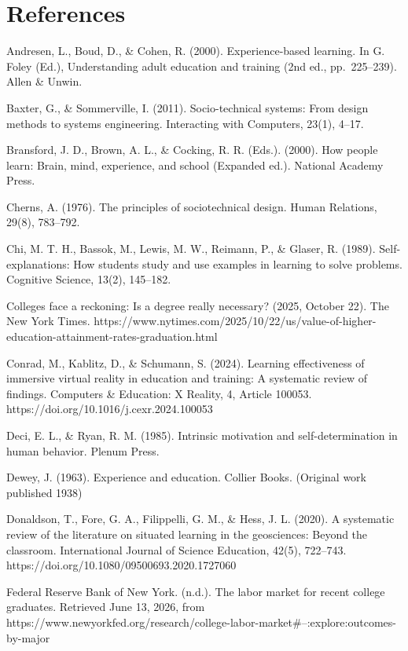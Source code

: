 \documentclass[
  12pt]{article}
\begin{document}
\section{References}\label{references}

Andresen, L., Boud, D., \& Cohen, R. (2000). Experience-based learning.
In G. Foley (Ed.), Understanding adult education and training (2nd ed.,
pp.~225--239). Allen \& Unwin.

Baxter, G., \& Sommerville, I. (2011). Socio-technical systems: From
design methods to systems engineering. Interacting with Computers,
23(1), 4--17.

Bransford, J. D., Brown, A. L., \& Cocking, R. R. (Eds.). (2000). How
people learn: Brain, mind, experience, and school (Expanded ed.).
National Academy Press.

Cherns, A. (1976). The principles of sociotechnical design. Human
Relations, 29(8), 783--792.

Chi, M. T. H., Bassok, M., Lewis, M. W., Reimann, P., \& Glaser, R.
(1989). Self-explanations: How students study and use examples in
learning to solve problems. Cognitive Science, 13(2), 145--182.

Colleges face a reckoning: Is a degree really necessary? (2025, October
22). The New York Times.
https://www.nytimes.com/2025/10/22/us/value-of-higher-education-attainment-rates-graduation.html

Conrad, M., Kablitz, D., \& Schumann, S. (2024). Learning effectiveness
of immersive virtual reality in education and training: A systematic
review of findings. Computers \& Education: X Reality, 4, Article
100053. https://doi.org/10.1016/j.cexr.2024.100053

Deci, E. L., \& Ryan, R. M. (1985). Intrinsic motivation and
self-determination in human behavior. Plenum Press.

Dewey, J. (1963). Experience and education. Collier Books. (Original
work published 1938)

Donaldson, T., Fore, G. A., Filippelli, G. M., \& Hess, J. L. (2020). A
systematic review of the literature on situated learning in the
geosciences: Beyond the classroom. International Journal of Science
Education, 42(5), 722--743.
https://doi.org/10.1080/09500693.2020.1727060

Federal Reserve Bank of New York. (n.d.). The labor market for recent
college graduates. Retrieved June 13, 2026, from
https://www.newyorkfed.org/research/college-labor-market\#--:explore:outcomes-by-major
\end{document}
